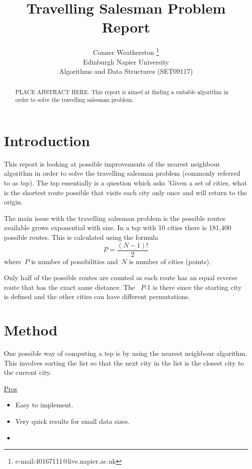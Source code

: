 \documentclass[conference,backref=page]{acmsiggraph}
\title{Travelling Salesman Problem\\
	   Report}
\author{Conner Weatherston \thanks{e-mail:40167111@live.napier.ac.uk} \\
Edinburgh Napier University\\
Algorithms and Data Structures (SET09117)}
\begin{document}
\maketitle

\raggedbottom

\begin{abstract}

PLACE ABSTRACT HERE.
This report is aimed at finding a suitable algorithm in order to solve the travelling salesman problem. 
\end{abstract}



\keywordlist


\section{Introduction}

This report is looking at possible improvements of the nearest neighbour algorithm in order to solve the travelling salesman problem (commonly referred to as tsp). The tsp essentially is a question which asks 'Given a set of cities, what is the shortest route possible that visits each city only once and will return to the origin.

The main issue with the travelling salesman problem is the possible routes available grows exponential with size. In a tsp with 10 cities there is 181,400 possible routes. This is calculated using the formula
 \begin{equation}
P =  \frac{(N-1)!}{2}
\end{equation}
where~$P$ is number of possibilities and~$N$ is number of cities (points).

Only half of the possible routes are counted as each route has an equal reverse route that has the exact same distance. The ~$P$-1 is there since the starting city is defined and the other cities can have different permutations.

\section{Method}
One possible way of computing a tsp is by using the nearest neighbour algorithm. This involves sorting the list so that the next city in the list is the closest city to the current city. 

\underline{Pros}
\begin{itemize}
	\item Easy to implement.
	\item Very quick results for small data sizes.
	\item 
	
\end{itemize}
\end{document}
